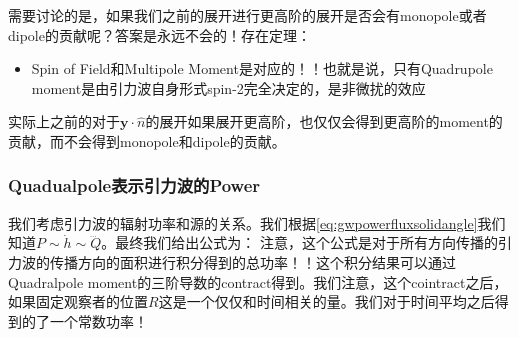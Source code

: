 \bigskip
{}

需要讨论的是，如果我们之前的展开进行更高阶的展开是否会有monopole或者dipole的贡献呢？答案是永远不会的！存在定理：
\begin{itemize}
  \item Spin of Field和Multipole Moment是对应的！！也就是说，只有Quadrupole
    moment是由引力波自身形式spin-2完全决定的，是非微扰的效应
\end{itemize}
实际上之前的对于$ \mathbf{y} \cdot \hat{n}
$的展开如果展开更高阶，也仅仅会得到更高阶的moment的贡献，而不会得到monopole和dipole的贡献。

\subsubsection{Quadualpole表示引力波的Power}

我们考虑引力波的辐射功率和源的关系。我们根据\cref{eq:gwpowerfluxsolidangle}我们知道$ P \sim
\dot{h} \sim \dddot{Q} $。最终我们给出公式为：
注意，这个公式是对于所有方向传播的引力波的传播方向的面积进行积分得到的总功率！！这个积分结果可以通过Quadralpole
moment的三阶导数的contract得到。我们注意，这个cointract之后，如果固定观察者的位置$ R
$这是一个仅仅和时间相关的量。我们对于时间平均之后得到的了一个常数功率！
